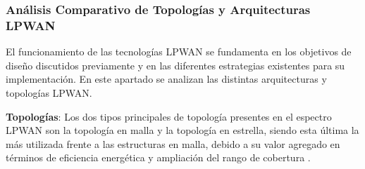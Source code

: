 \subsubsection{Análisis Comparativo de  Topologías  y  Arquitecturas  LPWAN}  El
funcionamiento de las tecnologías LPWAN se fundamenta en los objetivos de diseño
discutidos previamente y  en  las  diferentes  estrategias  existentes  para  su
implementación. En este apartado  se  analizan  las  distintas  arquitecturas  y
topologías LPWAN.

\textbf{Topologías}: Los dos tipos principales  de  topología  presentes  en  el
espectro LPWAN son la topología en malla y la topología en estrella, siendo esta
última la más utilizada frente a las estructuras en malla,  debido  a  su  valor
agregado en  términos  de  eficiencia  energética  y  ampliación  del  rango  de
cobertura \parencite{chilamkurthy2022low,chaudhari2020lpwan}.


